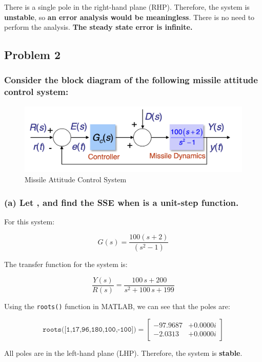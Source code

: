 \documentclass[12pt, letterpaper]{../assignment}
\begin{document}
\begin{answer}
    There is a single pole in the right-hand plane (RHP).
    Therefore, the system is \textbf{unstable}, so \textbf{an error analysis would be meaningless}.
    There is no need to perform the analysis.
    \textbf{The steady state error is infinite.} 
\end{answer}

\subsection*{Problem 2}
\subsubsection*{Consider the block diagram of the following missile attitude control system:}

\begin{figure}[H]
    \centering
    \includegraphics[width=0.7\linewidth]{./figures/Q2_diagram.png}
    \caption{Missile Attitude Control System}
    \label{fig:q2}
\end{figure}

\subsubsection*{(a) Let , and find the SSE when  is a unit-step function.}

For this system:

$$ G(s) = \frac{100(s+2)}{(s^2 -1)} $$

The transfer function for the system is:

$$ \frac{Y(s)}{R(s)} = \frac{100\,s+200}{s^2+100\,s+199} $$

Using the \texttt{roots()} function in MATLAB, we can see that the poles are:

$$ \texttt{roots([1,17,96,180,100,-100])} = \left[ \begin{array}{cc} 
    -97.9687 &+ 0.0000i\\
    -2.0313 &+ 0.0000i
\end{array} \right] $$

All poles are in the left-hand plane (LHP). Therefore, the system is \textbf{stable}.
\end{document}
